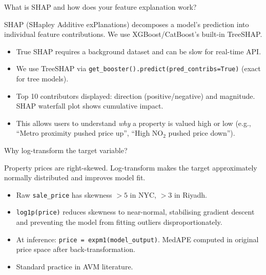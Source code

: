\documentclass[11pt, a4paper, twoside]{article}
\begin{document}
\bigskip

\begin{question}{What is SHAP and how does your feature explanation work?}
\begin{shortanswer}
SHAP (SHapley Additive exPlanations) decomposes a model's prediction into
individual feature contributions. We use XGBoost/CatBoost's built-in
TreeSHAP.
\end{shortanswer}

\begin{detail}
\begin{itemize}
  \item True SHAP requires a background dataset and can be slow for real-time
        API.
  \item We use TreeSHAP via \texttt{get\_booster().predict(pred\_contribs=True)}
        (exact for tree models).
  \item Top 10 contributors displayed: direction (positive/negative) and
        magnitude. SHAP waterfall plot shows cumulative impact.
  \item This allows users to understand \emph{why} a property is valued high or
        low (e.g., ``Metro proximity pushed price up'', ``High NO$_2$ pushed
        price down'').
\end{itemize}
\end{detail}
\end{question}

\bigskip

\begin{question}{Why log-transform the target variable?}
\begin{shortanswer}
Property prices are right-skewed. Log-transform makes the target
approximately normally distributed and improves model fit.
\end{shortanswer}

\begin{detail}
\begin{itemize}
  \item Raw \texttt{sale\_price} has skewness $> 5$ in NYC, $> 3$ in Riyadh.
  \item \texttt{log1p(price)} reduces skewness to near-normal, stabilising
        gradient descent and preventing the model from fitting outliers
        disproportionately.
  \item At inference: \texttt{price = expm1(model\_output)}. MedAPE computed in
        original price space after back-transformation.
  \item Standard practice in AVM literature.
\end{itemize}
\end{detail}
\end{question}
\end{document}
